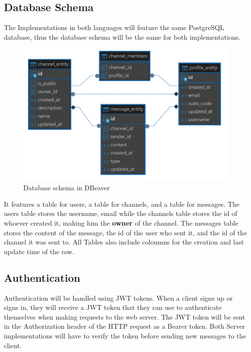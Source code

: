 \documentclass[a4paper,12pt]{article}
\begin{document}
	\subsection{Database Schema}
	\label{subsec:database_schema}
	The Implementations in both languages will feature the same PostgreSQL database, thus the database schema will 
	be the same for both implementations.
	\begin{figure}[h]
		\centering
		\includegraphics[width=\textwidth]{dbeaver_database_representation.png}
		\caption{Database schema in DBeaver}
		\label{fig:dbeaver_database_representation}
	\end{figure}
	
	It features a table for users, a table for channels, and a table for messages. The users table stores the username, email
	while the channels table stores the id of whoever created it, making him the \textbf{owner} of the channel. The messages table
	stores the content of the message, the id of the user who sent it, and the id of the channel it was sent to. All Tables also
	include coloumns for the creation and last update time of the row.

	\subsection{Authentication}
	\label{subsec:authentication}
	Authentication will be handled using JWT tokens. When a client signs up or signs in, they will receive a JWT token that
	they can use to authenticate themselves when making requests to the web server. The JWT token will be sent in the 
	Authorization header of the HTTP request as a Bearer token. Both Server implementations will have to verify the token 
	before sending new messages to the client.
\end{document}
